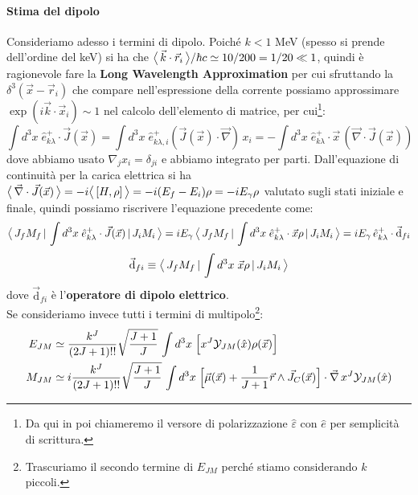 \paragraph{Stima del dipolo} Consideriamo adesso i termini di dipolo. Poiché $k< 1$ MeV (spesso si prende dell'ordine del keV) si ha che $\bigl\langle\, \vec{k}\cdot\vec{r}_i\, \bigr\rangle/\hbar c\simeq 10/200 = 1/20\ll 1$, quindi è ragionevole fare la \textbf{Long Wavelength Approximation} per cui sfruttando la $\delta^3(\vec{x}-\vec{r}_i)$ che compare nell'espressione della corrente possiamo approssimare $\exp{(i\vec{k}\cdot\vec{x}_i)}\sim 1$ nel calcolo dell'elemento di matrice, per cui\footnote{Da qui in poi chiameremo il versore di polarizzazione $\widehat{\varepsilon}$ con $\hat{e}$ per semplicità di scrittura.}:
$$\int d^3x\; \hat{e}_{k\lambda}^+ \cdot \vec{J}(\vec{x}) = \int d^3x\; \hat{e}_{k\lambda,i}^+  (\vec{J}(\vec{x})\cdot \vec{\nabla})\,x_i = - \int d^3x \; \hat{e}_{k\lambda}^+ \cdot \vec{x}\, (\vec{\nabla}\cdot\vec{J}(\vec{x})) $$
dove abbiamo usato $\nabla_j x_i = \delta_{ji}$ e abbiamo integrato per parti. Dall'equazione di continuità per la carica elettrica si ha $\bigl\langle\, \vec{\nabla}\cdot\vec{J}(\vec{x})\, \bigr\rangle = -i\bigl\langle\, [H,\rho]\, \bigr\rangle = -i(E_f-E_i)\rho = -i E_\gamma \rho$  valutato sugli stati iniziale e finale, quindi possiamo riscrivere l'equazione precedente come:
$$\bigl\langle\, J_fM_f\, |\,\int d^3x \; \hat{e}^+_{k\lambda}\cdot \vec{J}(\vec{x})\, |\,J_iM_i\, \bigr\rangle = iE_\gamma \, \bigl\langle\, J_fM_f\, |\,\int d^3x \; \hat{e}^+_{k\lambda}\cdot \vec{x}\rho\, |\,J_iM_i\, \bigr\rangle = i E_\gamma \, \hat{e}^+_{k\lambda} \cdot \vec{\mathrm{d}}_{fi}$$
$$\vec{\mathrm{d}}_{fi} \equiv \bigl\langle\, J_fM_f\, |\,\int d^3x \; \vec{x}\rho\, |\,J_iM_i\, \bigr\rangle$$
dove $\vec{\mathrm{d}}_{fi}$ è l'\textbf{operatore di dipolo elettrico}.\\
Se consideriamo invece tutti i termini di multipolo\footnote{Trascuriamo il secondo termine di $E_{JM}$ perché stiamo considerando $k$ piccoli.}:
\begin{displaymath}
\begin{aligned}
E_{JM} &\simeq \frac{k^J}{(2J+1)!!} \sqrt{\frac{J+1}{J}}\, \int d^3x \; \Bigl [ x^J \mathcal{Y}_{JM}(\hat{x})\rho(\vec{x}) \Bigr ] \\
M_{JM} &\simeq i\frac{k^J}{(2J+1)!!} \sqrt{\frac{J+1}{J}}\, \int d^3x \; \Bigl [ \vec{\mu}(\vec{x}) + \frac{1}{J+1} \vec{r}\land \vec{J}_C(\vec{x}) \Bigr ]\cdot \vec{\nabla}\,x^J\mathcal{Y}_{JM}(\hat{x})
\end{aligned}
\end{displaymath}
